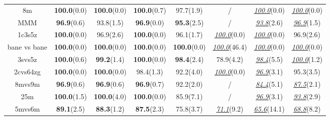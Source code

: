 \documentclass{article}
\theoremstyle{plain}
\theoremstyle{definition}
\theoremstyle{remark}
\begin{document}
\begin{table}[t!]
\begin{tabular}{ccccc|ccc}
\scriptsize{8m}               & \textbf{100.0}\scriptsize{(0.0)} & \textbf{100.0}\scriptsize{(0.0)} & \textbf{100.0}\scriptsize{(0.7)} & 97.7\scriptsize{(1.9)}  & /           & \emph{\underline{100.0}}\scriptsize{(0.0)} & \emph{\underline{100.0}}\scriptsize{(0.0)} \\
\scriptsize{MMM}              & \textbf{96.9}\scriptsize{(0.6)}  & 93.8\scriptsize{(1.5)}  & \textbf{96.9}\scriptsize{(0.0)}  & \textbf{95.3}\scriptsize{(2.5)}  & /           & \emph{\underline{93.8}}\scriptsize{(2.6)}  & \emph{\underline{96.9}}\scriptsize{(1.5)}  \\
\scriptsize{1c3s5z}           & \textbf{100.0}\scriptsize{(0.0)} & 96.9\scriptsize{(2.6)}  & \textbf{100.0}\scriptsize{(0.0)} & 96.1\scriptsize{(1.7)}  & 
\emph{\underline{100.0}}\scriptsize{(0.0)}  & \emph{\underline{100.0}}\scriptsize{(0.0)} & 96.9\scriptsize{(2.6)}  \\
\scriptsize{bane vs bane}     & \textbf{100.0}\scriptsize{(0.0)} & \textbf{100.0}\scriptsize{(0.0)} & \textbf{100.0}\scriptsize{(0.0)} & \textbf{100.0}\scriptsize{(0.0)} & \emph{\underline{100.0}}\scriptsize{(46.4)} & \emph{\underline{100.0}}\scriptsize{(0.0)} & \emph{\underline{100.0}}\scriptsize{(0.0)} \\
\scriptsize{3svs5z}           & \textbf{100.0}\scriptsize{(0.6)} & \textbf{99.2}\scriptsize{(1.4)}  & \textbf{100.0}\scriptsize{(0.0)} & \textbf{98.4}\scriptsize{(2.4)}  & 78.9\scriptsize{(4.2)}   & \emph{\underline{98.4}}\scriptsize{(5.5)}  & \emph{\underline{100.0}}\scriptsize{(1.2)} \\
\scriptsize{2cvs64zg}         & \textbf{100.0}\scriptsize{(0.0)} & \textbf{100.0}\scriptsize{(0.0)} & 98.4\scriptsize{(1.3)}  & 92.2\scriptsize{(4.0)}  & \emph{\underline{100.0}}\scriptsize{(0.0)}  & \emph{\underline{96.9}}\scriptsize{(3.1)}  & 95.3\scriptsize{(3.5)}  \\
\scriptsize{8mvs9m}           & \textbf{96.9}\scriptsize{(0.6)} & \textbf{96.9}\scriptsize{(0.6)}  & \textbf{96.9}\scriptsize{(0.7)}  & 92.2\scriptsize{(2.0)}  & /           & \emph{\underline{84.4}}\scriptsize{(5.1)}  & \emph{\underline{87.5}}\scriptsize{(2.1)}  \\
\scriptsize{25m}              & \textbf{100.0}\scriptsize{(1.5)} & \textbf{100.0}\scriptsize{(4.0)} & \textbf{100.0}\scriptsize{(0.0)} & 85.9\scriptsize{(7.1)}  & /           & \emph{\underline{96.9}}\scriptsize{(3.1)}  & \emph{\underline{93.8}}\scriptsize{(2.9)}  \\
\scriptsize{5mvs6m}           & \textbf{89.1}\scriptsize{(2.5)}  & \textbf{88.3}\scriptsize{(1.2)}  & \textbf{87.5}\scriptsize{(2.3)}  & 75.8\scriptsize{(3.7)}  & \emph{\underline{71.1}}\scriptsize{(9.2)}   & \emph{\underline{65.6}}\scriptsize{(14.1)} & \emph{\underline{68.8}}\scriptsize{(8.2)}  \\

\end{tabular}
\end{table}
\end{document}
